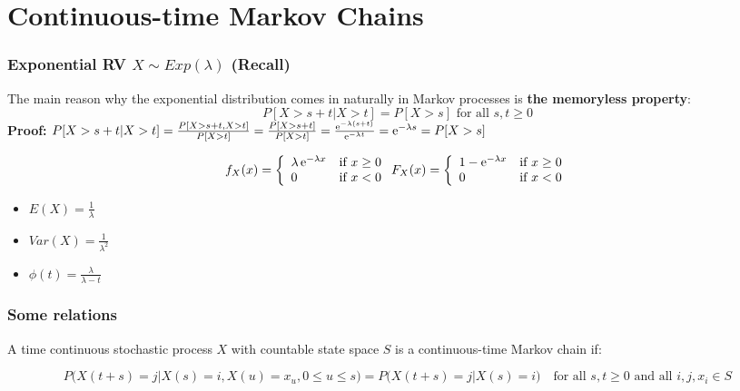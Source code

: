 \section{Continuous-time Markov Chains }

\subsubsection{Exponential RV $X\sim Exp(\lambda)$ (Recall) }
The main reason why the exponential distribution comes in naturally in Markov processes is \textbf{the memoryless property}: 
$$P[X>s+t|X>t]=P[X>s] \text{ for all } s,t\geq 0$$
\textbf{Proof: }$P[X>s+t|X>t]=\frac{P[X>s+t,X>t]}{P[X>t]}=\frac{P[X>s+t]}{P[X>t]}=\frac{\operatorname{\mathrm e}^{-\lambda(s+t)}}{\operatorname{\mathrm e}^{-\lambda t}}=\operatorname{\mathrm e}^{-\lambda s}=P[X>s]$

\begin{minipage}{0.7\textwidth}
\begin{equation}
f_X(x) = \left\{ \begin{array}{ll}  \lambda\operatorname{\mathrm e}^{-\lambda x}  & \mbox{if } x\geq 0 \\ 0 & \mbox{if } x<0 \end{array} \right.\\
F_X(x) = \left\{ \begin{array}{ll}  1-\operatorname{\mathrm e}^{-\lambda x}  & \mbox{if } x\geq 0 \\ 0 & \mbox{if } x<0 \end{array} \right.\nonumber
\end{equation}
\end{minipage}
\begin{minipage}{0.3\textwidth}
	\begin{itemize}
		\item $E(X)=\frac {1}{\lambda}$
		\item $Var(X)=\frac {1}{\lambda^2}$
		\item $\phi(t)=\frac{\lambda}{\lambda-t}$
	\end{itemize}
\end{minipage}
\hfill

\subsubsection{Some relations }
A time continuous stochastic process $X$ with countable state space $S$ is a continuous-time Markov chain if: 

$$P\big(X(t+s)=j\big|X(s)=i,X(u)=x_u,0\leq u\leq s\big)=P\big(X(t+s)=j\big|X(s)=i\big) \quad\text{for all } s,t\geq 0 \text{ and all } i,j,x_i\in S$$


